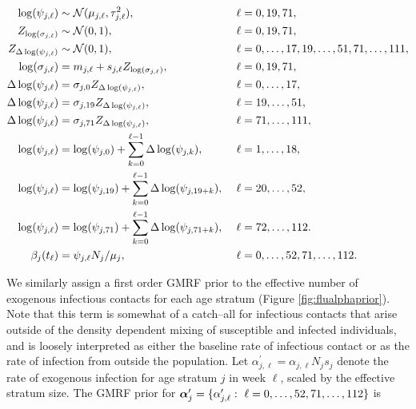\begin{footnotesize}
	\begin{align}
	\log(\psi_{j,\ell}) &\sim \mcN(\mu_{j,\ell},\tau_{j,\ell}^2),&\ &\ell= 0,19,71, \nonumber\\
	Z_{\log(\sigma_{j,\ell})} &\sim \mcN(0,1),&\ &\ell=0,19,71, \nonumber \\
	Z_{\Delta\log(\psi_{j,\ell})} &\sim \mcN(0,1),&\ &\ell=0,\dots,17,19,\dots,51,71,\dots,111, \nonumber \\ 
	\log(\sigma_{j,\ell}) &= m_{j,\ell} + s_{j,\ell}Z_{\log(\sigma_{j,\ell})},&\ &\ell = 0,19,71,\nonumber\\
	\Delta\log(\psi_{j,\ell})&= \sigma_{j,0} Z_{\Delta\log(\psi_{j,\ell})},&\ &\ell=0,\dots,17, \nonumber\\
	\Delta\log(\psi_{j,\ell})&= \sigma_{j,19} Z_{\Delta\log(\psi_{j,\ell})},&\ &\ell=19,\dots,51, \nonumber\\
	\Delta\log(\psi_{j,\ell})&= \sigma_{j,71} Z_{\Delta\log(\psi_{j,\ell})},&\ &\ell=71,\dots,111, \nonumber\\
	\log(\psi_{j,\ell}) &= \log(\psi_{j,0}) + \sum_{k=0}^{\ell-1}\Delta\log(\psi_{j,k}),&\ &\ell = 1,\dots,18, \nonumber\\
	\log(\psi_{j,\ell}) &= \log(\psi_{j,19}) + \sum_{k=0}^{\ell-1}\Delta\log(\psi_{j,19+k}),&\ &\ell = 20,\dots,52, \nonumber\\
	\log(\psi_{j,\ell}) &= \log(\psi_{j,71}) + \sum_{k=0}^{\ell-1}\Delta\log(\psi_{j,71+k}),&\ &\ell = 72,\dots,112. \nonumber \\
	\beta_j(t_\ell) &= \psi_{j,\ell}N_j/ \mu_{j},&\ &\ell=0,\dots,52,71,\dots,112. \nonumber
	\end{align}
\end{footnotesize}

We similarly assign a first order GMRF prior to the effective number of exogenous infectious contacts for each age stratum (Figure \ref{fig:flualphaprior}). Note that this term is somewhat of a catch--all for infectious contacts that arise outside of the density dependent mixing of susceptible and infected individuals, and is loosely interpreted as either the baseline rate of infectious contact or as the rate of infection from outside the population. Let $ \alpha^\prime_{j,\ell} = \alpha_{j,\ell}N_js_j $ denote the rate of exogenous infection for age stratum $ j $ in week $ \ell $, scaled by the effective stratum size. The GMRF prior for $ \balpha^\prime_j = \lbrace\alpha^\prime_{j,\ell}:\ \ell=0,\dots,52,71,\dots,112\rbrace $ is

